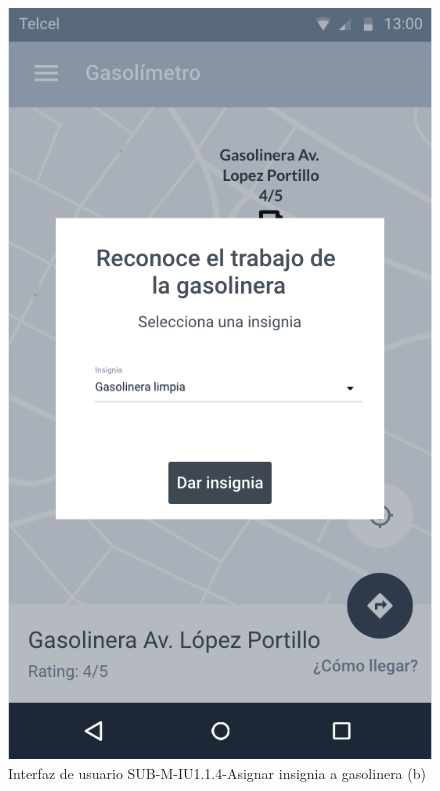 \begin{figure}[H]
	\centering
	\includegraphics[scale=.55]{Capitulo4/software/submodulos/mediciones/images/sub-m-iu1_1_4_b}
	\caption{Interfaz de usuario SUB-M-IU1.1.4-Asignar insignia a gasolinera (b)}
	\label{fig:sub-m-iu1.1.4.b}
\end{figure}